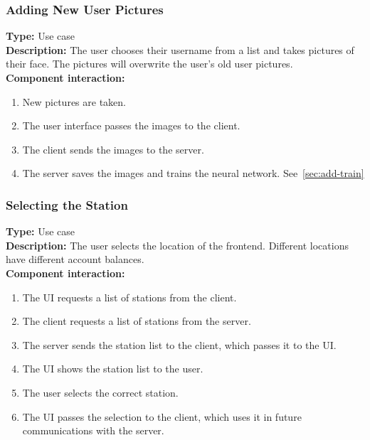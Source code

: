 \documentclass[11pt]{article}
\begin{document}
\subsubsection{Adding New User Pictures}
\textbf{Type:} Use case\\
\textbf{Description:} The user chooses their username from a list and takes pictures of their face. 
The pictures will overwrite the user's old user pictures.\\
\textbf{Component interaction:}
\begin{enumerate} 
\item{New pictures are taken.}
\item{The user interface passes the images to the client.}
\item{The client sends the images to the server.}
\item{The server saves the images and trains the neural network. See~\ref{sec:add-train}}
\end{enumerate}

\subsubsection{Selecting the Station}
\textbf{Type:} Use case\\
\textbf{Description:} The user selects the location of the frontend. Different locations
have different account balances.\\
\textbf{Component interaction:}
\begin{enumerate}
\item{The UI requests a list of stations from the client.}
\item{The client requests a list of stations from the server.}
\item{The server sends the station list to the client, which passes it to the UI.}
\item{The UI shows the station list to the user.}
\item{The user selects the correct station.}
\item{The UI passes the selection to the client, which uses it in future communications with
the server.}
\end{enumerate}
\end{document}
